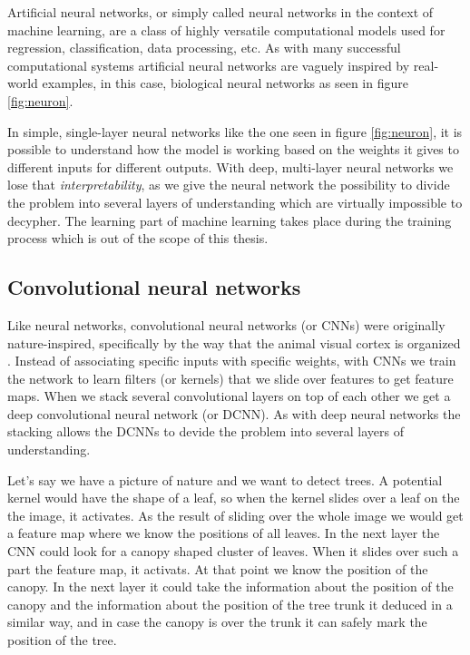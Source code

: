 Artificial neural networks, or simply called neural networks in the context of 
machine learning, are a class of highly versatile computational models used for 
regression, classification, data processing, etc. As with many successful computational 
systems artificial neural networks are vaguely inspired by real-world examples,
in this case, biological neural networks as seen in figure \ref{fig:neuron}. 

In simple, single-layer neural networks like the one seen in figure \ref{fig:neuron}, 
it is possible to understand how the model is working based on the weights it gives
to different inputs for different outputs. With deep, multi-layer neural networks 
we lose that \textit{interpretability}, as we give the neural network the possibility
to divide the problem into several layers of understanding which are virtually 
impossible to decypher. The learning part of machine learning takes place during the
training process which is out of the scope of this thesis.

\subsection{Convolutional neural networks}
\label{sec:cnn}

Like neural networks, convolutional neural networks (or CNNs) were originally 
nature-inspired, specifically by the way that the animal visual cortex is 
organized \citep{fukushima1980neocognitron}. Instead of associating specific
inputs with specific weights, with CNNs we train the network to learn filters 
(or kernels) that we slide over features to get feature maps. When we stack
several convolutional layers on top of each other we get a deep convolutional
neural network (or DCNN). As with deep neural networks the stacking allows 
the DCNNs to devide the problem into several layers of understanding. 

Let's say we have a picture of nature and we want to detect trees. A potential 
kernel would have the shape of a leaf, so when the kernel slides over a leaf on the
the image, it activates. As the result of sliding over the whole image we would
get a feature map where we know the positions of all leaves. In the next layer 
the CNN could look for a canopy shaped cluster of leaves. When it slides
over such a part the feature map, it activats. At that point we know the position
of the canopy. In the next layer it could take the information about the position
of the canopy and the information about the position of the tree trunk it deduced
in a similar way, and in case the canopy is over the trunk it can safely mark the
position of the tree.

